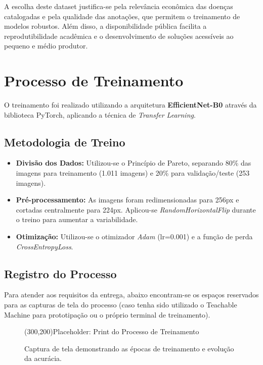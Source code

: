 \documentclass[12pt,a4paper]{article}
\begin{document}
A escolha deste dataset justifica-se pela relevância econômica das doenças catalogadas e pela qualidade das anotações, que permitem o treinamento de modelos robustos. Além disso, a disponibilidade pública facilita a reprodutibilidade acadêmica e o desenvolvimento de soluções acessíveis ao pequeno e médio produtor.

\newpage

\section{Processo de Treinamento}

O treinamento foi realizado utilizando a arquitetura \textbf{EfficientNet-B0} através da biblioteca PyTorch, aplicando a técnica de \textit{Transfer Learning}. 

\subsection{Metodologia de Treino}
\begin{itemize}
    \item \textbf{Divisão dos Dados:} Utilizou-se o Princípio de Pareto, separando 80\% das imagens para treinamento (1.011 imagens) e 20\% para validação/teste (253 imagens).
    \item \textbf{Pré-processamento:} As imagens foram redimensionadas para 256px e cortadas centralmente para 224px. Aplicou-se \textit{RandomHorizontalFlip} durante o treino para aumentar a variabilidade.
    \item \textbf{Otimização:} Utilizou-se o otimizador \textit{Adam} (lr=0.001) e a função de perda \textit{CrossEntropyLoss}.
\end{itemize}

\subsection{Registro do Processo}
Para atender aos requisitos da entrega, abaixo encontram-se os espaços reservados para as capturas de tela do processo (caso tenha sido utilizado o Teachable Machine para prototipação ou o próprio terminal de treinamento).

\begin{figure}[h!]
    \centering
    \color{gray}
    \framebox(300,200){Placeholder: Print do Processo de Treinamento}
    \caption{Captura de tela demonstrando as épocas de treinamento e evolução da acurácia.}
\end{figure}
\end{document}
